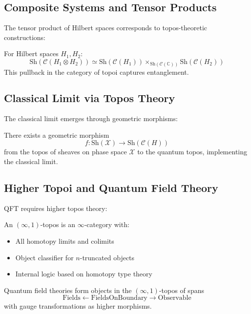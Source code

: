 \subsection{Composite Systems and Tensor Products}

The tensor product of Hilbert spaces corresponds to topos-theoretic constructions:

\begin{proposition}
For Hilbert spaces $H_1, H_2$:
\[
\text{Sh}(\mathcal{C}(H_1 \otimes H_2)) \simeq \text{Sh}(\mathcal{C}(H_1)) \times_{\text{Sh}(\mathcal{C}(\mathbb{C}))} \text{Sh}(\mathcal{C}(H_2))
\]
This pullback in the category of topoi captures entanglement.
\end{proposition}

\subsection{Classical Limit via Topos Theory}

The classical limit emerges through geometric morphisms:

\begin{theorem}
There exists a geometric morphism
\[
f: \text{Sh}(\mathcal{X}) \to \text{Sh}(\mathcal{C}(H))
\]
from the topos of sheaves on phase space $\mathcal{X}$ to the quantum topos, implementing the classical limit.
\end{theorem}

\subsection{Higher Topoi and Quantum Field Theory}

QFT requires higher topos theory:

\begin{definition}
An $(\infty,1)$-topos is an $\infty$-category with:
\begin{itemize}
\item All homotopy limits and colimits
\item Object classifier for $n$-truncated objects
\item Internal logic based on homotopy type theory
\end{itemize}
\end{definition}

\begin{example}
Quantum field theories form objects in the $(\infty,1)$-topos of spans
\[
\text{Fields} \leftarrow \text{FieldsOnBoundary} \rightarrow \text{Observable}
\]
with gauge transformations as higher morphisms.
\end{example}


